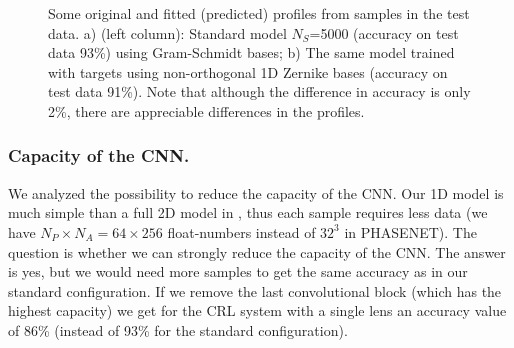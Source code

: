 \documentclass[preprint]{iucr}
\begin{document}
\begin{figure}

 

    


    \caption{Some original and fitted (predicted) profiles from samples in the test data. a) (left column): Standard model $N_S$=5000 (accuracy on test  data 93\%) using Gram-Schmidt bases;
    b) The same model trained with targets using  non-orthogonal 1D Zernike bases (accuracy on test  data 91\%). Note that although the difference in accuracy is only 2\%, there are appreciable differences in the profiles.
    }
\end{figure}


\subsubsection{Capacity of the CNN.}
We analyzed the possibility to reduce the capacity of the CNN. Our 1D model is much simple than a full 2D model in \cite{Saha2020}, thus each sample requires less data (we have $N_P\times N_A=64\times 256$ float-numbers instead of $32^3$ in PHASENET). The question is whether we can strongly reduce the capacity of the CNN. The answer is yes, but we would need more samples to get the same accuracy as in our standard configuration. If we remove the last convolutional block (which has the highest capacity) we get for the CRL system with a single lens an accuracy value of 86\% (instead of 93\% for the standard configuration).
\end{document}
